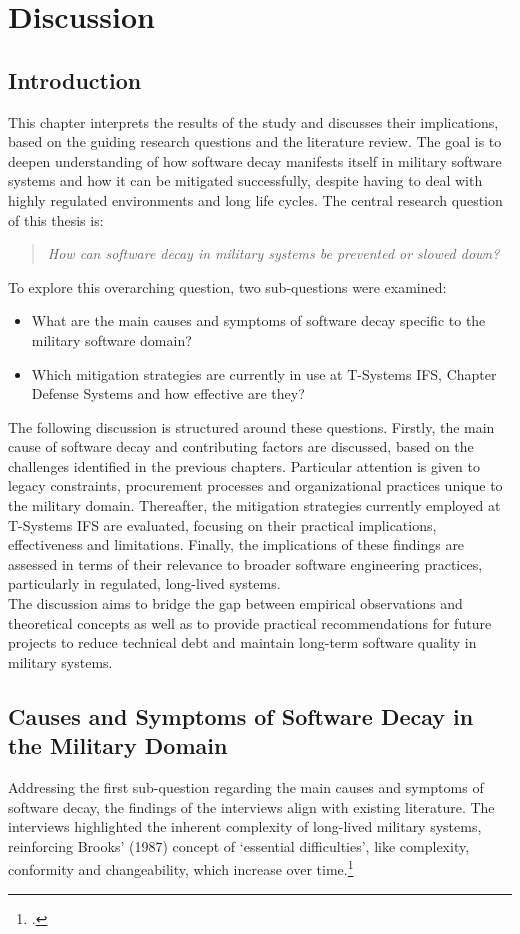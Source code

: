 \section{Discussion}
\subsection{Introduction}
This chapter interprets the results of the study and discusses their implications, based on the guiding research questions and the literature review. The goal is to deepen understanding of how software decay manifests itself in military software systems
and how it can be mitigated successfully, despite having to deal with highly regulated environments and long life cycles.
The central research question of this thesis is:
\begin{quote}
\textit{How can software decay in military systems be prevented or slowed down?}
\end{quote}
To explore this overarching question, two sub-questions were examined:
\begin{itemize}
    \item What are the main causes and symptoms of software decay specific to the military software domain?
    \item Which mitigation strategies are currently in use at T-Systems IFS, Chapter Defense Systems and how effective are they?
\end{itemize}
The following discussion is structured around these questions. Firstly, the main cause of software decay and contributing factors are discussed, based on the challenges identified in the previous chapters. Particular attention is given to legacy constraints, procurement processes and organizational practices unique to the military domain.
Thereafter, the mitigation strategies currently employed at T-Systems IFS are evaluated, focusing on their practical implications, effectiveness and limitations. Finally, the implications of these findings are assessed in terms of their relevance to broader software engineering practices, particularly in regulated, long-lived systems.\\
The discussion aims to bridge the gap between empirical observations and theoretical concepts as well as to provide practical recommendations for future projects to reduce technical debt and maintain long-term software quality in military systems.

\subsection{Causes and Symptoms of Software Decay in the Military Domain}
Addressing the first sub-question regarding the main causes and symptoms of software decay, the findings of the interviews align with existing literature. The interviews highlighted the inherent complexity of long-lived military systems, reinforcing Brooks' (1987) concept of `essential difficulties', like complexity, conformity and changeability, which increase over time.\footcite[2-3]{brooksNoSilverBullet1987}\\

